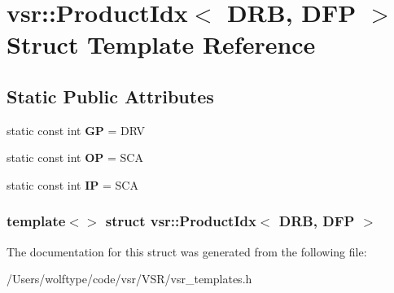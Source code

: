 \hypertarget{structvsr_1_1_product_idx_3_01_d_r_b_00_01_d_f_p_01_4}{\section{vsr\-:\-:Product\-Idx$<$ D\-R\-B, D\-F\-P $>$ Struct Template Reference}
\label{structvsr_1_1_product_idx_3_01_d_r_b_00_01_d_f_p_01_4}
}
\subsection*{Static Public Attributes}
\begin{DoxyCompactItemize}
\item 
\hypertarget{structvsr_1_1_product_idx_3_01_d_r_b_00_01_d_f_p_01_4_a1583f01c86daf34fb017fa53cf4f5055}{static const int {\bfseries G\-P} = D\-R\-V}\label{structvsr_1_1_product_idx_3_01_d_r_b_00_01_d_f_p_01_4_a1583f01c86daf34fb017fa53cf4f5055}

\item 
\hypertarget{structvsr_1_1_product_idx_3_01_d_r_b_00_01_d_f_p_01_4_a471aa923b6e3985cfece9e4219658cab}{static const int {\bfseries O\-P} = S\-C\-A}\label{structvsr_1_1_product_idx_3_01_d_r_b_00_01_d_f_p_01_4_a471aa923b6e3985cfece9e4219658cab}

\item 
\hypertarget{structvsr_1_1_product_idx_3_01_d_r_b_00_01_d_f_p_01_4_afc6bb68de0b6dd9c63b042853e54d17b}{static const int {\bfseries I\-P} = S\-C\-A}\label{structvsr_1_1_product_idx_3_01_d_r_b_00_01_d_f_p_01_4_afc6bb68de0b6dd9c63b042853e54d17b}

\end{DoxyCompactItemize}
\subsubsection*{template$<$$>$ struct vsr\-::\-Product\-Idx$<$ D\-R\-B, D\-F\-P $>$}



The documentation for this struct was generated from the following file\-:\begin{DoxyCompactItemize}
\item 
/\-Users/wolftype/code/vsr/\-V\-S\-R/vsr\-\_\-templates.\-h\end{DoxyCompactItemize}
